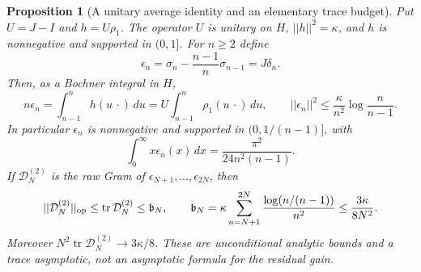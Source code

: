 \documentclass[11pt]{article}
\def\norm#1{||#1||}%
\newtheorem{proposition}[theorem]{Proposition}
\theoremstyle{remark}
\newcommand{\norm}[1]{\left\lVert #1\right\rVert}
\begin{document}
\begin{proposition}[A unitary average identity and an elementary trace budget]
\label{prop:ns61-average-budget}
Put $U=J-I$ and $h=U\rho_1$. The operator $U$ is unitary on $H$,
$\norm h^2=\kappa$, and $h$ is nonnegative and supported in $(0,1]$.
For $n\geq2$ define
\[
 \epsilon_n=\sigma_n-\frac{n-1}{n}\sigma_{n-1}=J\delta_n.
\]
Then, as a Bochner integral in $H$,
\begin{equation}
 n\epsilon_n=\int_{n-1}^{n}h(u\,\cdot)\,du
       =U\int_{n-1}^{n}\rho_1(u\,\cdot)\,du,
 \qquad
 \norm{\epsilon_n}^2\leq
       \frac{\kappa}{n^2}\log\frac n{n-1}.
 \label{eq:ns61-average}
\end{equation}
In particular $\epsilon_n$ is nonnegative and supported in
$(0,1/(n-1)]$, with
\begin{equation}
 \int_0^\infty x\epsilon_n(x)\,dx
             =\frac{\pi^2}{24n^2(n-1)}.
 \label{eq:ns61-positive-first-moment}
\end{equation}
If $\mathcal D_N^{(2)}$ is the raw Gram of
$\epsilon_{N+1},\ldots,\epsilon_{2N}$, then
\begin{equation}
 \norm{\mathcal D_N^{(2)}}_{\rm op}
 \leq\operatorname{tr}\mathcal D_N^{(2)}\leq \mathfrak b_N,
 \qquad \mathfrak b_N=\kappa\sum_{n=N+1}^{2N}
          \frac{\log(n/(n-1))}{n^2}
 \leq\frac{3\kappa}{8N^2}.
 \label{eq:ns61-trace-budget}
\end{equation}
Moreover $N^2\operatorname{tr}\mathcal D_N^{(2)}\to3\kappa/8$.
These are unconditional analytic bounds and a trace asymptotic, not
an asymptotic formula for the residual gain.
\end{proposition}
\end{document}
